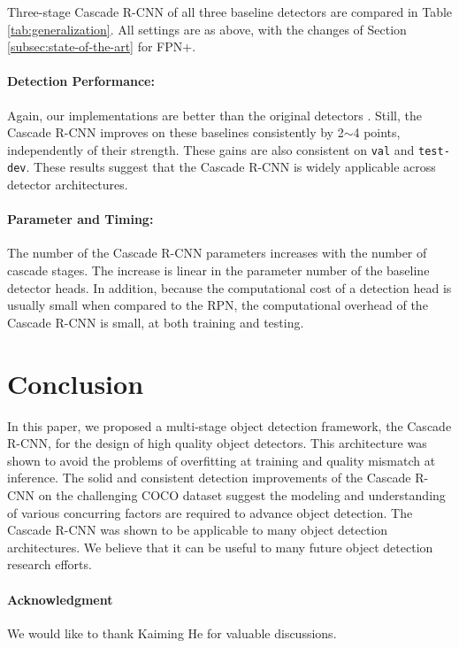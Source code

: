 \documentclass[10pt,twocolumn,letterpaper]{article}
\begin{document}
Three-stage Cascade R-CNN of all three baseline detectors
are compared in Table \ref{tab:generalization}. All settings are as above,
with the changes of Section \ref{subsec:state-of-the-art} for FPN+.

\paragraph{Detection Performance:} Again, our implementations are better than
the original detectors \cite{DBLP:conf/nips/RenHGS15,DBLP:conf/nips/DaiLHS16,lin2017feature}. Still, the Cascade R-CNN improves on these baselines
consistently by 2$\sim$4 points, independently of their strength.
These gains are also consistent on \texttt{val} and \texttt{test-dev}. These
results suggest that the Cascade R-CNN is widely applicable across
detector architectures.


\paragraph{Parameter and Timing:} The number of the Cascade R-CNN parameters increases with the number of cascade stages. The increase is linear in the parameter number of the baseline detector heads. In addition, because the computational cost of a detection head is usually small when compared to the RPN, the computational overhead of the Cascade R-CNN is small, at both training and testing.


\section{Conclusion}

In this paper, we proposed a multi-stage object detection framework,
the Cascade R-CNN, for the design of high quality object detectors.
This architecture was shown to avoid the problems of overfitting at
training and quality mismatch at inference. The solid and consistent
detection improvements of the Cascade R-CNN on the challenging COCO dataset
suggest the modeling and understanding of various concurring factors
are required to advance object detection. The Cascade R-CNN was shown to be
applicable to many object detection architectures. We believe that it can be
useful to many future object detection research efforts.

\paragraph{Acknowledgment} We would like to thank Kaiming He for valuable discussions.

{\small


}
\end{document}
